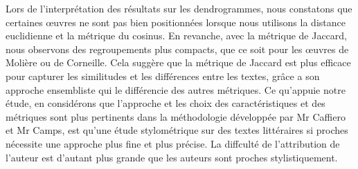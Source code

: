 \hspace{0,5cm}Lors de l'interprétation des résultats sur les dendrogrammes, nous constatons
que certaines œuvres ne sont pas bien positionnées lorsque nous utilisons la
distance euclidienne et la métrique du cosinus. En revanche, avec la métrique de
Jaccard, nous observons des regroupements plus compacts, que ce soit pour les
œuvres de Molière ou de Corneille. Cela suggère que la métrique de Jaccard est
plus efficace pour capturer les similitudes et les différences entre les textes,
grâce a son approche ensembliste qui le différencie des autres métriques. 
Ce qu'appuie notre étude, en considérons que
l'approche et les choix des caractéristiques et des métriques sont plus pertinents
dans la méthodologie développée par Mr Caffiero et Mr Camps, est qu'une étude
stylométrique sur des textes littéraires si proches nécessite une approche plus
fine et plus précise. La diffculté de l'attribution de l'auteur est d'autant
plus grande que les auteurs sont proches stylistiquement.